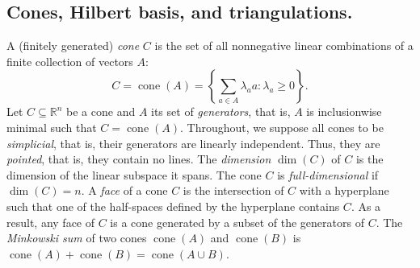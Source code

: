 \documentclass[11pt,a4paper]{amsart}
\renewcommand*{\geq}{\geqslant}
\renewcommand*{\leq}{\leqslant}
\theoremstyle{plain}
\theoremstyle{definition}
\newcommand{\R}{\mathbb{R}}
\DeclareMathOperator{\cone}{cone}
\begin{document}


\subsection{Cones, Hilbert basis, and triangulations.}\label{section:cones}

A (finitely generated) \emph{cone} $C$ is the set of all nonnegative linear combinations of a finite collection of vectors $A$:
$$C=\cone(A) = \left\{\sum_{a\in A} \lambda_a a\colon \lambda_a\geq 0\right\}.$$
Let $C\subseteq\R^n$ be a cone and $A$ its set of \emph{generators}, that is, $A$ is inclusionwise minimal such that $C=\cone(A)$.
Throughout, we suppose all cones to be \emph{simplicial}, that is, their generators are linearly independent.
Thus, they are \emph{pointed}, that is, they contain no lines.
The \emph{dimension} $ \dim(C) $ of $C$ is the dimension of the linear subspace it spans. The cone $ C $ is \emph{full-dimensional} if $ \dim(C) = n $.
A \emph{face} of a cone $ C $ is the intersection of $ C $ with a hyperplane such that one of the half-spaces defined by the hyperplane contains $C$.
As a result, any face of $C$ is a cone generated by a subset of the generators of $C$.
The \emph{Minkowski sum} of two cones $\cone(A)$ and $\cone(B)$ is $\cone(A)+\cone(B)=\cone(A\cup B)$.
\end{document}
